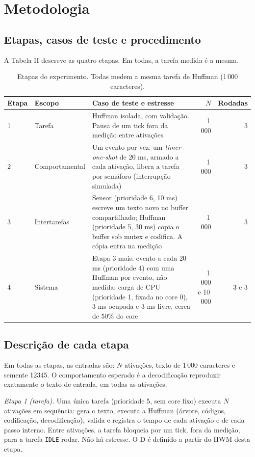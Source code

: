 \documentclass[conference,a4paper]{IEEEtran}
\begin{document}
\section{Metodologia}
\subsection{Etapas, casos de teste e procedimento}
A Tabela II descreve as quatro etapas. Em todas, a tarefa medida é a mesma.

\begin{table}[!t]
\centering
\caption{Etapas do experimento. Todas medem a mesma tarefa de Huffman (1\,000 caracteres).}
\small
\setlength{\tabcolsep}{3pt}
\begin{tabular}{llp{9.4cm}rr}
\toprule
Etapa & Escopo & Caso de teste e estresse & $N$ & Rodadas \\
\midrule
1 & Tarefa & Huffman isolada, com validação. Pausa de um tick fora da medição entre ativações & 1\,000 & 3 \\
2 & Comportamental & Um evento por vez: um \emph{timer} \emph{one-shot} de 20 ms, armado a cada ativação, libera a tarefa por semáforo (interrupção simulada) & 1\,000 & 3 \\
3 & Intertarefas & Sensor (prioridade 6, 10 ms) escreve um texto novo no buffer compartilhado; Huffman (prioridade 5, 30 ms) copia o buffer sob mutex e codifica. A cópia entra na medição & 1\,000 & 3 \\
4 & Sistema & Etapa 3 mais: evento a cada 20 ms (prioridade 4) com uma Huffman por evento, não medida; carga de CPU (prioridade 1, fixada no core 0), 3 ms ocupada e 3 ms livre, cerca de 50\% do core & 1\,000 e 10\,000 & 3 e 3 \\
\bottomrule
\end{tabular}
\end{table}

\subsection{Descrição de cada etapa}
Em todas as etapas, as entradas são: $N$ ativações, texto de 1\,000 caracteres e semente 12345. O comportamento esperado é a decodificação reproduzir exatamente o texto de entrada, em todas as ativações.

\emph{Etapa 1 (tarefa).} Uma única tarefa (prioridade 5, sem core fixo) executa $N$ ativações em sequência: gera o texto, executa a Huffman (árvore, códigos, codificação, decodificação), valida e registra o tempo de cada ativação e de cada passo interno. Entre ativações, a tarefa bloqueia por um tick, fora da medição, para a tarefa \texttt{IDLE} rodar. Não há estresse. O D é definido a partir do HWM desta etapa.
\end{document}
